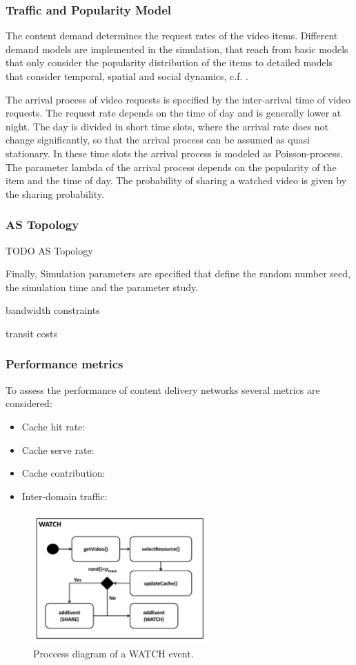 \subsubsection{Traffic and Popularity Model}
The content demand determines the request rates of the video items.
Different demand models are implemented in the simulation, that reach from basic models that only consider the popularity distribution of the items to detailed models that consider temporal, spatial and social dynamics, c.f. .

The arrival process of video requests is specified by the inter-arrival time of video requests.
The request rate depends on the time of day and is generally lower at night.
The day is divided in short time slots, where the arrival rate does not change significantly, so that the arrival process can be assumed as quasi stationary.
In these time slots the arrival process is modeled as Poisson-process.
The parameter lambda of the arrival process depends on the popularity of the item and the time of day.
The probability of sharing a watched video is given by the sharing probability.

\subsubsection{AS Topology}
TODO AS Topology

Finally, Simulation parameters are specified that define the random number seed, the simulation time and the parameter study.

bandwidth constraints

transit costs

\subsubsection{Performance metrics}

To assess the performance of content delivery networks several metrics are considered:

\begin{itemize}
\item Cache hit rate:
\item Cache serve rate:
\item Cache contribution:
\item Inter-domain traffic:
\end{itemize}

\begin{figure}[bt]
  \centering
  \includegraphics[width=0.6\textwidth]{hierarchical/simulative/figures/watch}
  \caption{Proccess diagram of a WATCH event.}
  \label{fig:WATCH}
\end{figure}


